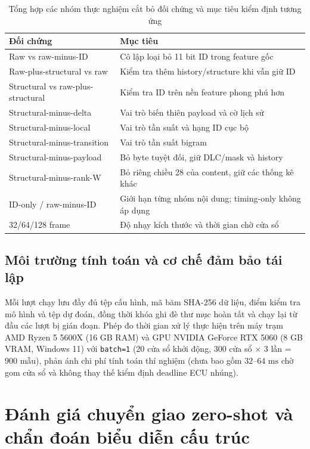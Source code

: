 \documentclass[12pt, a4paper, reqno, oneside]{book}
\DeclareRobustCommand{\code}[1]{\nolinkurl{#1}}
\begin{document}
{\renewcommand{\arraystretch}{0.88}
\begin{table}[htbp]\centering\footnotesize
\caption{Tổng hợp các nhóm thực nghiệm cắt bỏ đối chứng và mục tiêu kiểm định tương ứng}\label{tab:ablations}
\begin{tabular}{P{4.6cm}P{9.2cm}}
\toprule
Đối chứng & Mục tiêu\\\midrule
Raw vs raw-minus-ID & Cô lập loại bỏ 11 bit ID trong feature gốc\\
Raw-plus-structural vs raw & Kiểm tra thêm history/structure khi vẫn giữ ID\\
Structural vs raw-plus-structural & Kiểm tra ID trên nền feature phong phú hơn\\
Structural-minus-delta & Vai trò biến thiên payload và cờ lịch sử\\
Structural-minus-local & Vai trò tần suất và hạng ID cục bộ\\
Structural-minus-transition & Vai trò tần suất bigram\\
Structural-minus-payload & Bỏ byte tuyệt đối, giữ DLC/mask và history\\
Structural-minus-rank-W & Bỏ riêng chiều 28 của content, giữ các thống kê khác\\
ID-only / raw-minus-ID & Giới hạn từng nhóm nội dung; timing-only không áp dụng\\
32/64/128 frame & Độ nhạy kích thước và thời gian chờ cửa sổ\\\bottomrule
\end{tabular}
\end{table}}

\subsection{Môi trường tính toán và cơ chế đảm bảo tái lập}
Mỗi lượt chạy lưu đầy đủ tệp cấu hình, mã băm SHA-256 dữ liệu, điểm kiểm tra mô hình và tệp dự đoán, đồng thời khóa ghi đè thư mục hoàn tất và chạy lại từ đầu các lượt bị gián đoạn. Phép đo thời gian xử lý thực hiện trên máy trạm AMD Ryzen 5 5600X (16 GB RAM) và GPU NVIDIA GeForce RTX 5060 (8 GB VRAM, Windows 11) với \code{batch=1} (20 cửa sổ khởi động, 300 cửa sổ $\times$ 3 lần = 900 mẫu), phản ánh chi phí tính toán thí nghiệm (chưa bao gồm $32\text{--}64\text{ ms}$ chờ gom cửa sổ và không thay thế kiểm định deadline ECU nhúng).

\section{Đánh giá chuyển giao zero-shot và chẩn đoán biểu diễn cấu trúc}\label{sec:zeroshot-eval}
\end{document}
